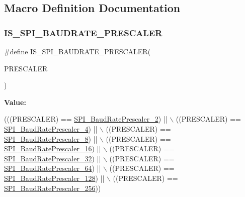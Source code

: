 \subsection{Macro Definition Documentation}
\mbox{\label{group___s_p_i___baud_rate___prescaler_gae79f46ed9f91e39dc1f6912cb25fc716}} 
\subsubsection{\texorpdfstring{I\+S\+\_\+\+S\+P\+I\+\_\+\+B\+A\+U\+D\+R\+A\+T\+E\+\_\+\+P\+R\+E\+S\+C\+A\+L\+ER}{IS\_SPI\_BAUDRATE\_PRESCALER}}
{\footnotesize\ttfamily \#define I\+S\+\_\+\+S\+P\+I\+\_\+\+B\+A\+U\+D\+R\+A\+T\+E\+\_\+\+P\+R\+E\+S\+C\+A\+L\+ER(\begin{DoxyParamCaption}\item[{}]{P\+R\+E\+S\+C\+A\+L\+ER }\end{DoxyParamCaption})}

{\bfseries Value\+:}
\begin{DoxyCode}
(((PRESCALER) == \hyperlink{group___s_p_i___baud_rate___prescaler_ga88cd6d416c87b382396dbf4c02e3bd4b}{SPI\_BaudRatePrescaler\_2}) || \(\backslash\)
                                              ((PRESCALER) == 
      \hyperlink{group___s_p_i___baud_rate___prescaler_ga17ac4858cb9387289ee7c3d94a9b54be}{SPI\_BaudRatePrescaler\_4}) || \(\backslash\)
                                              ((PRESCALER) == 
      \hyperlink{group___s_p_i___baud_rate___prescaler_ga023a1e4c04586f2feb0d4b03b2e0c230}{SPI\_BaudRatePrescaler\_8}) || \(\backslash\)
                                              ((PRESCALER) == 
      \hyperlink{group___s_p_i___baud_rate___prescaler_ga5ef8587bb96e3ec98e9fde770756fc7d}{SPI\_BaudRatePrescaler\_16}) || \(\backslash\)
                                              ((PRESCALER) == 
      \hyperlink{group___s_p_i___baud_rate___prescaler_ga1d30cecaa412cee5250c69644207c652}{SPI\_BaudRatePrescaler\_32}) || \(\backslash\)
                                              ((PRESCALER) == 
      \hyperlink{group___s_p_i___baud_rate___prescaler_ga2c9cd96ed56432a83f8e4f46fbecb5e6}{SPI\_BaudRatePrescaler\_64}) || \(\backslash\)
                                              ((PRESCALER) == 
      \hyperlink{group___s_p_i___baud_rate___prescaler_gafa6c39c3ee16a08730356a5cd30f3648}{SPI\_BaudRatePrescaler\_128}) || \(\backslash\)
                                              ((PRESCALER) == 
      \hyperlink{group___s_p_i___baud_rate___prescaler_ga1e1aa6406f0e88ac557ba49fb8069e3e}{SPI\_BaudRatePrescaler\_256}))
\end{DoxyCode}


